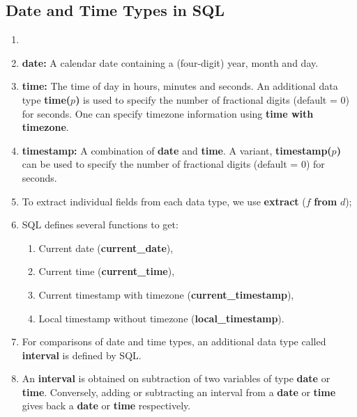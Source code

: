 \documentclass[journal,12pt,twocolumn]{IEEEtran}
\begin{document}
\subsection{Date and Time Types in SQL}
\begin{enumerate}
    \item 
    \item \textbf{date:} A calendar date containing a (four-digit) year, month 
    and day.
    \item \textbf{time:} The time of day in hours, minutes and seconds. An 
    additional data type \textbf{time($p$)} is used to specify the number of 
    fractional digits (default = 0) for seconds. One can specify timezone 
    information using \textbf{time with timezone}.
    \item \textbf{timestamp:} A combination of \textbf{date} and \textbf{time}. 
    A variant, \textbf{timestamp($p$)} can be used to specify the number of 
    fractional digits (default = 0) for seconds.
    \item To extract individual fields from each data type, we use 
    \textbf{extract} ($f$ \textbf{from} $d$);
    \item SQL defines several functions to get:
    \begin{enumerate}
        \item Current date (\textbf{current\_date}), 
        \item Current time (\textbf{current\_time}), 
        \item Current timestamp with timezone (\textbf{current\_timestamp}),
        \item Local timestamp without timezone (\textbf{local\_timestamp}).
    \end{enumerate}
    \item For comparisons of date and time types, an additional data type 
    called \textbf{interval} is defined by SQL.
    \item An \textbf{interval} is obtained on subtraction of two variables of 
    type \textbf{date} or \textbf{time}. Conversely, adding or subtracting an 
    interval from a \textbf{date} or \textbf{time} gives back a \textbf{date} 
    or \textbf{time} respectively.
\end{enumerate}
\end{document}
